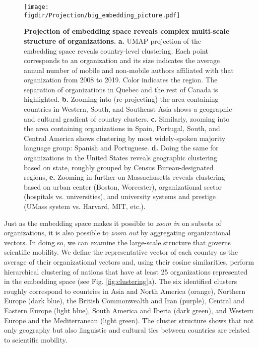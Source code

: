 \documentclass[12pt]{article} %
\def\figdir{../Figs}
\begin{document}
%
%
\begin{figure}[hp!]
	\centering
	\texttt{[image: \\figdir/Projection/big\_embedding\_picture.pdf]}
	\caption{
		\textbf{Projection of embedding space reveals complex multi-scale structure of organizations.}
		\textbf{a.}
		UMAP projection \autocite{mcinnes2018umap} of the embedding space reveals country-level clustering.
		Each point corresponds to an organization and its size indicates the average annual number of mobile and non-mobile authors affiliated with that organization from 2008 to 2019.
		Color indicates the region.
		The separation of organizations in Quebec and the rest of Canada is highlighted.
		\textbf{b.} Zooming into (re-projecting) the area containing countries in Western, South, and Southeast Asia shows a geographic and cultural gradient of country clusters.
		\textbf{c.} Similarly, zooming into the area containing organizations in Spain, Portugal, South, and Central America shows clustering by most widely-spoken majority language group: Spanish and Portuguese.
		\textbf{d.} Doing the same for organizations in the United States reveals geographic clustering based on state, roughly grouped by Census Bureau-designated regions,
		\textbf{e.} Zooming in further on Massachusetts reveals clustering based on urban center (Boston, Worcester), organizational sector (hospitals vs. universities), and university systems and prestige (UMass system vs. Harvard, MIT, etc.).
	}
	\label{fig:projection}
\end{figure}


Just as the embedding space makes it possible to \textit{zoom in} on subsets of organizations, it is also possible to \textit{zoom out} by aggregating organizational vectors.
In doing so, we can examine the large-scale structure that governs scientific mobility.
We define the representative vector of each country as the average of their organizational vectors and, using their cosine similarities, perform hierarchical clustering of nations that have at least 25 organizations represented in the embedding space (see Fig. \ref{fig:clustering}a).
The six identified clusters roughly correspond to countries in Asia and North America (orange), Northern Europe (dark blue), the British Commonwealth and Iran (purple), Central and Eastern Europe (light blue), South America and Iberia (dark green), and Western Europe and the Mediterranean (light green).
The cluster structure shows that not only geography but also linguistic and cultural ties between countries are related to scientific mobility.
\end{document}
